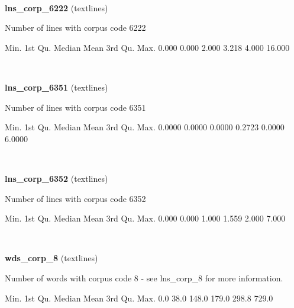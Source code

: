 \documentclass[]{article}
\newenvironment{Shaded}{\begin{snugshade}}{\end{snugshade}}
\newcommand{\FloatTok}[1]{\textcolor[rgb]{0.00,0.00,0.81}{{#1}}}
\newcommand{\NormalTok}[1]{{#1}}
\begin{document}
~

\vspace{1em}

\textbf{lns\_corp\_6222} (textlines)

Number of lines with corpus code 6222

\begin{Shaded}
\begin{Highlighting}[]
   \NormalTok{Min. 1st Qu.  Median    Mean 3rd Qu.    Max. }
  \FloatTok{0.000}   \FloatTok{0.000}   \FloatTok{2.000}   \FloatTok{3.218}   \FloatTok{4.000}  \FloatTok{16.000} 
\end{Highlighting}
\end{Shaded}

~

\vspace{1em}

\textbf{lns\_corp\_6351} (textlines)

Number of lines with corpus code 6351

\begin{Shaded}
\begin{Highlighting}[]
   \NormalTok{Min. 1st Qu.  Median    Mean 3rd Qu.    Max. }
 \FloatTok{0.0000}  \FloatTok{0.0000}  \FloatTok{0.0000}  \FloatTok{0.2723}  \FloatTok{0.0000}  \FloatTok{6.0000} 
\end{Highlighting}
\end{Shaded}

~

\vspace{1em}

\textbf{lns\_corp\_6352} (textlines)

Number of lines with corpus code 6352

\begin{Shaded}
\begin{Highlighting}[]
   \NormalTok{Min. 1st Qu.  Median    Mean 3rd Qu.    Max. }
  \FloatTok{0.000}   \FloatTok{0.000}   \FloatTok{1.000}   \FloatTok{1.559}   \FloatTok{2.000}   \FloatTok{7.000} 
\end{Highlighting}
\end{Shaded}

~

\vspace{1em}

\textbf{wds\_corp\_8} (textlines)

Number of words with corpus code 8 - see lns\_corp\_8 for more
information.

\begin{Shaded}
\begin{Highlighting}[]
   \NormalTok{Min. 1st Qu.  Median    Mean 3rd Qu.    Max. }
    \FloatTok{0.0}    \FloatTok{38.0}   \FloatTok{148.0}   \FloatTok{179.0}   \FloatTok{298.8}   \FloatTok{729.0} 
\end{Highlighting}
\end{Shaded}
\end{document}
